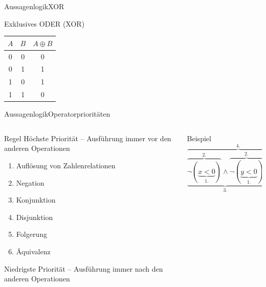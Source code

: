 \documentclass[xelatex,aspectratio=169]{beamer}
\begin{document}
\begin{frame}{Aussagenlogik}{XOR}
  \begin{block}{Exklusives ODER (XOR)}
    \centering
    \begin{tabular}{ccc}
      \toprule
      $A$ & $B$ & $A \oplus B$ \\
      \midrule
      0   & 0   & 0            \\
      0   & 1   & 1            \\
      1   & 0   & 1            \\
      1   & 1   & 0            \\
      \bottomrule
    \end{tabular}
  \end{block}

\end{frame}

\begin{frame}{Aussagenlogik}{Operatorprioritäten}
  \begin{columns}
    \begin{column}{0.5\textwidth}
      \begin{block}{Regel}
        Höchste Priorität -- Ausführung immer vor den anderen Operationen

        \begin{enumerate}
          \item Auflösung von Zahlenrelationen
          \item Negation
          \item Konjunktion
          \item Disjunktion
          \item Folgerung
          \item Äquivalenz
        \end{enumerate}

        Niedrigste Priorität -- Ausführung immer nach den anderen Operationen


      \end{block}
    \end{column}
    \begin{column}{0.5\textwidth}
      \begin{exampleblock}{Beispiel}
        \small
        \[ \overbrace{\underbrace{\overbrace{\lnot (\underbrace{x < 0}_{1.})}^{2.} \land \overbrace{\lnot (\underbrace{y < 0}_{1.})}^{2.}}_{3.} \lor \underbrace{L > 4}_{1.}}^{4.} \]
      \end{exampleblock}
    \end{column}
  \end{columns}

\end{frame}
\end{document}
